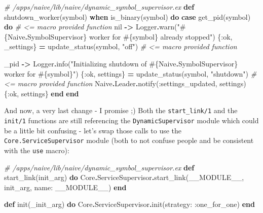 \documentclass[
  oneside]{book}
\newenvironment{Shaded}{\begin{snugshade}}{\end{snugshade}}
\newcommand{\CommentTok}[1]{\textcolor[rgb]{0.56,0.35,0.01}{\textit{#1}}}
\newcommand{\ConstantTok}[1]{\textcolor[rgb]{0.00,0.00,0.00}{#1}}
\newcommand{\KeywordTok}[1]{\textcolor[rgb]{0.13,0.29,0.53}{\textbf{#1}}}
\newcommand{\NormalTok}[1]{#1}
\newcommand{\OperatorTok}[1]{\textcolor[rgb]{0.81,0.36,0.00}{\textbf{#1}}}
\newcommand{\OtherTok}[1]{\textcolor[rgb]{0.56,0.35,0.01}{#1}}
\newcommand{\StringTok}[1]{\textcolor[rgb]{0.31,0.60,0.02}{#1}}
\newcommand{\VariableTok}[1]{\textcolor[rgb]{0.00,0.00,0.00}{#1}}
\begin{document}
\begin{Shaded}
\begin{Highlighting}[]
  \CommentTok{\# /apps/naive/lib/naive/dynamic\_symbol\_supervisor.ex}
  \KeywordTok{def}\NormalTok{ shutdown\_worker(symbol) }\KeywordTok{when}\NormalTok{ is\_binary(symbol) }\KeywordTok{do}
    \KeywordTok{case}\NormalTok{ get\_pid(symbol) }\KeywordTok{do} \CommentTok{\# \textless{}= macro provided function}
      \ConstantTok{nil} \OperatorTok{{-}\textgreater{}}
        \ConstantTok{Logger}\OperatorTok{.}\NormalTok{warn(}\StringTok{"}\OtherTok{\#\{}\ConstantTok{Naive}\OperatorTok{.}\ConstantTok{SymbolSupervisor}\OtherTok{\}}\StringTok{ worker for }\OtherTok{\#\{}\NormalTok{symbol}\OtherTok{\}}\StringTok{ already stopped"}\NormalTok{)}
\NormalTok{        \{}\VariableTok{:ok}\NormalTok{, \_settings\} }\OperatorTok{=}\NormalTok{ update\_status(symbol, }\StringTok{"off"}\NormalTok{) }\CommentTok{\# \textless{}= macro provided function}

\NormalTok{      \_pid }\OperatorTok{{-}\textgreater{}}
        \ConstantTok{Logger}\OperatorTok{.}\NormalTok{info(}\StringTok{"Initializing shutdown of }\OtherTok{\#\{}\ConstantTok{Naive}\OperatorTok{.}\ConstantTok{SymbolSupervisor}\OtherTok{\}}\StringTok{ worker for }\OtherTok{\#\{}\NormalTok{symbol}\OtherTok{\}}\StringTok{"}\NormalTok{)}
\NormalTok{        \{}\VariableTok{:ok}\NormalTok{, settings\} }\OperatorTok{=}\NormalTok{ update\_status(symbol, }\StringTok{"shutdown"}\NormalTok{) }\CommentTok{\# \textless{}= macro provided function}
        \ConstantTok{Naive}\OperatorTok{.}\ConstantTok{Leader}\OperatorTok{.}\NormalTok{notify(}\VariableTok{:settings\_updated}\NormalTok{, settings)}
\NormalTok{        \{}\VariableTok{:ok}\NormalTok{, settings\}}
    \KeywordTok{end}
  \KeywordTok{end}
\end{Highlighting}
\end{Shaded}

And now, a very last change - I promise ;) Both the \texttt{start\_link/1} and the \texttt{init/1} functions are still referencing the \texttt{DynamicSupervisor} module which could be a little bit confusing - let's swap those calls to use the \texttt{Core.ServiceSupervisor} module (both to not confuse people and be consistent with the \texttt{use} macro):

\begin{Shaded}
\begin{Highlighting}[]
  \CommentTok{\# /apps/naive/lib/naive/dynamic\_symbol\_supervisor.ex}
  \KeywordTok{def}\NormalTok{ start\_link(init\_arg) }\KeywordTok{do}
    \ConstantTok{Core}\OperatorTok{.}\ConstantTok{ServiceSupervisor}\OperatorTok{.}\NormalTok{start\_link(}\ConstantTok{\_\_MODULE\_\_}\NormalTok{, init\_arg, }\VariableTok{name:} \ConstantTok{\_\_MODULE\_\_}\NormalTok{)}
  \KeywordTok{end}

  \KeywordTok{def}\NormalTok{ init(\_init\_arg) }\KeywordTok{do}
    \ConstantTok{Core}\OperatorTok{.}\ConstantTok{ServiceSupervisor}\OperatorTok{.}\NormalTok{init(}\VariableTok{strategy:} \VariableTok{:one\_for\_one}\NormalTok{)}
  \KeywordTok{end}
\end{Highlighting}
\end{Shaded}
\end{document}
